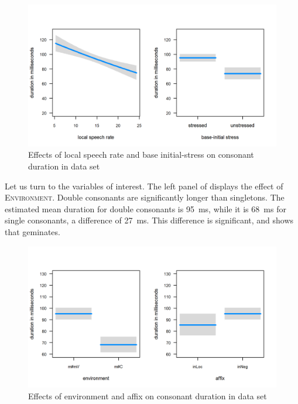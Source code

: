 \begin{figure}
	
	
	\includegraphics  [scale=0.8] {images/Corpus/inModelcov.png}
	\caption{Effects of local speech rate and base initial-stress on consonant duration in data set}
	\label{fig:covariates in}
\end{figure}

Let us turn to the variables of interest. The left panel of  displays the effect of \textsc{Environment}. Double consonants are significantly longer than singletons. The estimated mean duration for double consonants is 95~ms, while it is 68~ms for single consonants, a difference of 27~ms. This difference is significant, and shows that  geminates. 







\begin{figure}
	
	\includegraphics [scale=0.8]  {images/Corpus/inModel.png}
	\caption{Effects of environment and affix on consonant duration in data set}
	\label{fig:inModel}
\end{figure}



